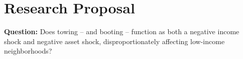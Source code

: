 \documentclass[12pt,letterpaper,doublespace, oneside]{article}
\begin{document}
\newcommand{\zz}{\mathbx Z}   %
\newcommand{\qq}{\mathbx Q}   %
\newcommand{\ff}{\mathbx F}   %
\newcommand{\rr}{\mathbx R}   %
\newcommand{\nn}{\mathbx N}   %
\newcommand{\cc}{\mathbx C}   %
\newcommand{\dd}{\mathsf D}   
\newcommand{\id}{\operatorname{id}} %
\newcommand{\im}{\operatorname{im}} %
\newcommand{\dom}{\operatorname{dom}} %
\newcommand{\abs}[1]{\left\lvert#1\right\rvert} %
\newcommand{\norm}[1]{\left\lVert#1\right\rVert} %
\newcommand{\modar}[1]{\operatorname{mod}{#1}} %
\newcommand{\set}[1]{\left\{#1\right\}} %
\newcommand{\setp}[2]{\left\{#1\ :\ #2\right\}} %
\newcommand{\lag}{\mathcal{L}}

\renewcommand\thepage{}

\renewcommand{\epsilon}{\varepsilon}
\renewcommand{\phi}{\varphi}
\renewcommand{\emptyset}{\varnothing}
\renewcommand{\geq}{\geqslant}
\renewcommand{\leq}{\leqslant}
\renewcommand{\Re}{\operatorname{Re}}
\renewcommand{\Im}{\operatorname{Im}}


\theoremstyle{theorem}
\newtheorem{theorem}{Theorem}
\theoremstyle{proposition}
\newtheorem{proposition}{Proposition}
\theoremstyle{definition}
\newtheorem{definition}{Definition}
\theoremstyle{lemma}
\newtheorem{lemma}[theorem]{Lemma}
\theoremstyle{corollary}
\newtheorem{corollary}[theorem]{Corollary}
\theoremstyle{example}
\newtheorem{example}[theorem]{Example}
\theoremstyle{remark}
\newtheorem{remark}[theorem]{Remark}
\theoremstyle{conclusion}
\newtheorem{conclusion}[theorem]{Conclusion}






\section{Research Proposal}

\noindent\textbf{Question:} Does towing -- and booting -- function as both a negative income shock and negative asset shock, disproportionately affecting low-income neighborhoods?
\end{document}

